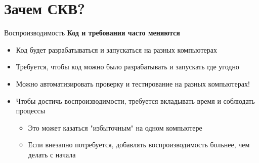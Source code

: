 \section{Зачем СКВ?}
\begin{frame}[t]{Воспроизводимость}
\textbf{Код и требования часто меняются}
\begin{itemize}
\item Код будет разрабатываться и запускаться на разных компьютерах
\item Требуется, чтобы код можно было разрабатывать и запускать где угодно
\item Можно автоматизировать проверку и тестирование на разных компьютерах!
\item Чтобы достичь воспроизводимости, требуется вкладывать время и соблюдать процессы
	\begin{itemize}
	\item Это может казаться "избыточным" на одном компьютере
	\item Если внезапно потребуется, добавлять воспроизводимость больнее, чем делать с начала
	\end{itemize}
\end{itemize}
\end{frame}

